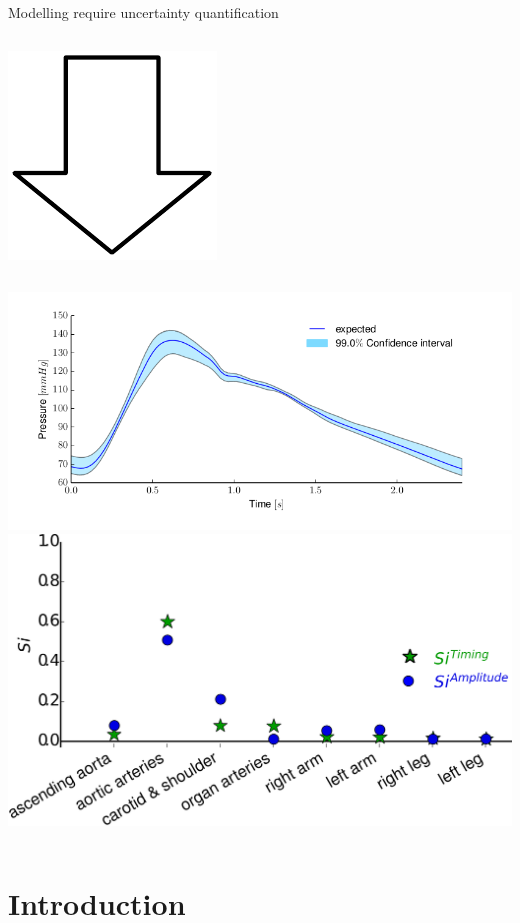 \documentclass{beamer}
\begin{document}
\begin{frame}{Modelling require uncertainty quantification}{}
\begin{columns}
    \end{columns} \pause
    \begin{center}
    \includegraphics[width=.1\textwidth]{figures/south.pdf}
    \end{center}
    \begin{columns}
        \includegraphics[width=\textwidth]{ntnu/AorticPressure_parameterUncertainty.png}
        \includegraphics[width=\textwidth]{ntnu/results/sensitivity-pointOfinflection.png}
    \end{columns}
    \end{frame}

\section{Introduction}
\end{document}
